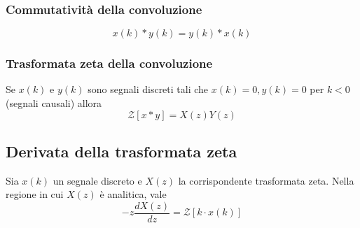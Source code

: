 \documentclass[11pt]{article}
\newcommand{\trz}{\mathcal{Z}}
\begin{document}
\subsubsection{Commutatività della convoluzione}
\begin{displaymath}
    x(k)*y(k)=y(k)*x(k)
\end{displaymath}
\subsubsection{Trasformata zeta della convoluzione}
Se $x(k)$ e $y(k)$ sono segnali discreti tali che $x(k)=0, y(k)=0$ per $k<0$ (segnali causali) allora 
\begin{displaymath}
    \trz [x*y]=X(z)Y(z)
\end{displaymath}
\subsection{Derivata della trasformata zeta}
Sia $x(k)$ un segnale discreto e $X(z)$ la corrispondente trasformata zeta. Nella regione in cui $X(z)$ è analitica, vale
\begin{displaymath}
    -z\frac{dX(z)}{dz} = \trz [k\cdot x(k)]
\end{displaymath}
\end{document}
